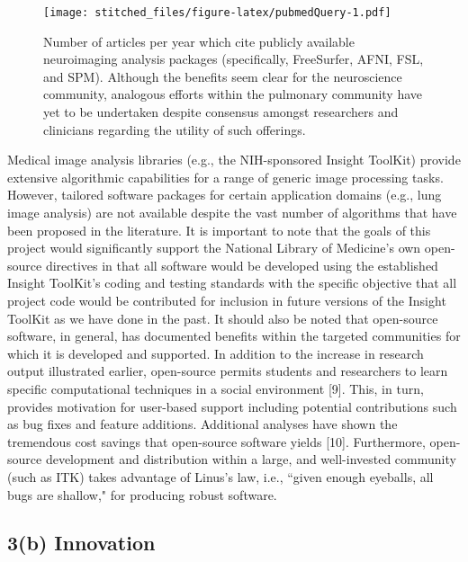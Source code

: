 \documentclass[11pt,]{article}
\begin{document}
\begin{figure}[htbp]
\centering
\texttt{[image: stitched\_files/figure-latex/pubmedQuery-1.pdf]}
\caption{Number of articles per year which cite publicly available
neuroimaging analysis packages (specifically, FreeSurfer, AFNI, FSL, and
SPM). Although the benefits seem clear for the neuroscience community,
analogous efforts within the pulmonary community have yet to be
undertaken despite consensus amongst researchers and clinicians
regarding the utility of such offerings.}
\end{figure}

Medical image analysis libraries (e.g., the NIH-sponsored Insight
ToolKit) provide extensive algorithmic capabilities for a range of
generic image processing tasks. However, tailored software packages for
certain application domains (e.g., lung image analysis) are not
available despite the vast number of algorithms that have been proposed
in the literature. It is important to note that the goals of this
project would significantly support the National Library of Medicine's
own open-source directives in that all software would be developed using
the established Insight ToolKit's coding and testing standards with the
specific objective that all project code would be contributed for
inclusion in future versions of the Insight ToolKit as we have done in
the past. It should also be noted that open-source software, in general,
has documented benefits within the targeted communities for which it is
developed and supported. In addition to the increase in research output
illustrated earlier, open-source permits students and researchers to
learn specific computational techniques in a social environment {[}9{]}.
This, in turn, provides motivation for user-based support including
potential contributions such as bug fixes and feature additions.
Additional analyses have shown the tremendous cost savings that
open-source software yields {[}10{]}. Furthermore, open-source
development and distribution within a large, and well-invested community
(such as ITK) takes advantage of Linus's law, i.e., ``given enough
eyeballs, all bugs are shallow," for producing robust software.

\subsection{\textbf{3(b) Innovation}}\label{b-innovation}
\end{document}
